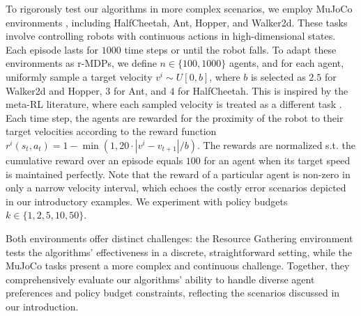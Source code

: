 \documentclass[letterpaper]{article} %
\begin{document}
To rigorously test our algorithms in more complex scenarios, we employ MuJoCo environments \cite{todorov2012mujoco,tassa2018deepmind,tunyasuvunakool2020}, including HalfCheetah, Ant, Hopper, and Walker2d. These tasks involve controlling robots with continuous actions in high-dimensional states. Each episode lasts for $1000$ time steps or until the robot falls. To adapt these environments as r-MDPs, we define $n \in \{100, 1000\}$ agents, and for each agent, uniformly sample a target velocity $v^i \sim U[0, b]$, where $b$ is selected as $2.5$ for Walker2d and Hopper, $3$ for Ant, and $4$ for HalfCheetah. This is inspired by the meta-RL literature, where each sampled velocity is treated as a different task \cite{finn2017model}.  Each time step, the agents are rewarded for the proximity of the robot to their target velocities according to the reward function $r^i(s_t, a_t) = 1 - \min(1, 20 \cdot \left| v^i - v_{t+1} \right| / b)$. The rewards are normalized s.t. the cumulative reward over an episode equals $100$ for an agent when its target speed is maintained perfectly. Note that the reward of a particular agent is non-zero in only a narrow velocity interval, which echoes the costly error scenarios depicted in our introductory examples. We experiment with policy budgets $k \in \{1, 2, 5, 10, 50\}$.

Both environments offer distinct challenges: the Resource Gathering environment tests the algorithms' effectiveness in a discrete, straightforward setting, while the MuJoCo tasks present a more complex and continuous challenge. Together, they comprehensively evaluate our algorithms’ ability to handle diverse agent preferences and policy budget constraints, reflecting the scenarios discussed in our introduction.
\end{document}
